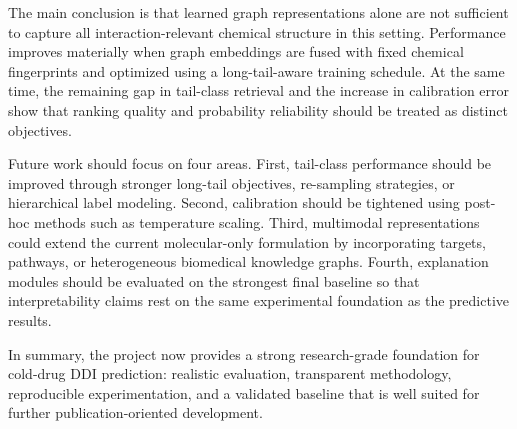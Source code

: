 \documentclass[12pt,a4paper]{report}
\begin{document}
The main conclusion is that learned graph representations alone are not sufficient to capture all interaction-relevant chemical structure in this setting. Performance improves materially when graph embeddings are fused with fixed chemical fingerprints and optimized using a long-tail-aware training schedule. At the same time, the remaining gap in tail-class retrieval and the increase in calibration error show that ranking quality and probability reliability should be treated as distinct objectives.

Future work should focus on four areas. First, tail-class performance should be improved through stronger long-tail objectives, re-sampling strategies, or hierarchical label modeling. Second, calibration should be tightened using post-hoc methods such as temperature scaling. Third, multimodal representations could extend the current molecular-only formulation by incorporating targets, pathways, or heterogeneous biomedical knowledge graphs. Fourth, explanation modules should be evaluated on the strongest final baseline so that interpretability claims rest on the same experimental foundation as the predictive results.

In summary, the project now provides a strong research-grade foundation for cold-drug DDI prediction: realistic evaluation, transparent methodology, reproducible experimentation, and a validated baseline that is well suited for further publication-oriented development.
\end{document}
